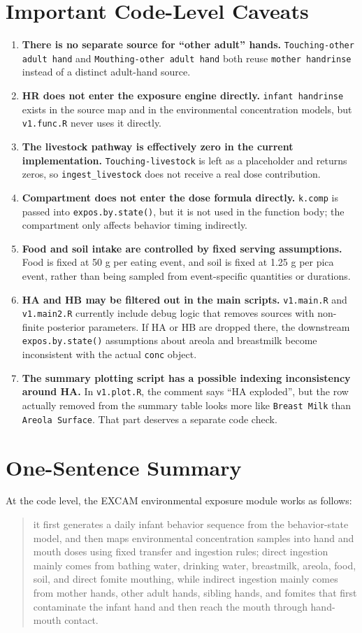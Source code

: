 \documentclass[11pt]{article}
\begin{document}
\section{Important Code-Level Caveats}
\begin{enumerate}[leftmargin=2em]
  \item \textbf{There is no separate source for ``other adult'' hands.} \texttt{Touching-other adult hand} and \texttt{Mouthing-other adult hand} both reuse \texttt{mother handrinse} instead of a distinct adult-hand source.
  \item \textbf{HR does not enter the exposure engine directly.} \texttt{infant handrinse} exists in the source map and in the environmental concentration models, but \texttt{v1.func.R} never uses it directly.
  \item \textbf{The livestock pathway is effectively zero in the current implementation.} \texttt{Touching-livestock} is left as a placeholder and returns zeros, so \texttt{ingest\_livestock} does not receive a real dose contribution.
  \item \textbf{Compartment does not enter the dose formula directly.} \texttt{k.comp} is passed into \texttt{expos.by.state()}, but it is not used in the function body; the compartment only affects behavior timing indirectly.
  \item \textbf{Food and soil intake are controlled by fixed serving assumptions.} Food is fixed at 50 g per eating event, and soil is fixed at 1.25 g per pica event, rather than being sampled from event-specific quantities or durations.
  \item \textbf{HA and HB may be filtered out in the main scripts.} \texttt{v1.main.R} and \texttt{v1.main2.R} currently include debug logic that removes sources with non-finite posterior parameters. If HA or HB are dropped there, the downstream \texttt{expos.by.state()} assumptions about areola and breastmilk become inconsistent with the actual \texttt{conc} object.
  \item \textbf{The summary plotting script has a possible indexing inconsistency around HA.} In \texttt{v1.plot.R}, the comment says ``HA exploded'', but the row actually removed from the summary table looks more like \texttt{Breast Milk} than \texttt{Areola Surface}. That part deserves a separate code check.
\end{enumerate}

\section{One-Sentence Summary}
At the code level, the EXCAM environmental exposure module works as follows:
\begin{quote}
it first generates a daily infant behavior sequence from the behavior-state model, and then maps environmental concentration samples into hand and mouth doses using fixed transfer and ingestion rules; direct ingestion mainly comes from bathing water, drinking water, breastmilk, areola, food, soil, and direct fomite mouthing, while indirect ingestion mainly comes from mother hands, other adult hands, sibling hands, and fomites that first contaminate the infant hand and then reach the mouth through hand-mouth contact.
\end{quote}
\end{document}
